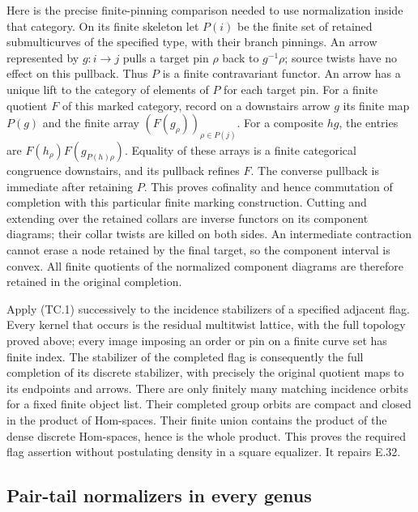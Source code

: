 Here is the precise finite-pinning comparison needed to use
normalization inside that category.  On its finite skeleton let $P(i)$
be the finite set of retained submulticurves of the specified type,
with their branch pinnings.  An arrow represented by $g:i\to j$
pulls a target pin $\rho$ back to $g^{-1}\rho$; source twists have no
effect on this pullback.  Thus $P$ is a finite contravariant functor.
An arrow has a unique lift to the category of elements of $P$ for each
target pin.  For a finite quotient $F$ of this marked category, record
on a downstairs arrow $g$ its finite map $P(g)$ and the finite array
$(F(g_\rho))_{\rho\in P(j)}$.  For a composite $hg$, the entries
are $F(h_\rho)F(g_{P(h)\rho})$.  Equality of these arrays is a finite
categorical congruence downstairs, and its pullback refines $F$.
The converse pullback is immediate after retaining $P$.
This proves cofinality and hence commutation of completion with this
particular finite marking construction.  Cutting and extending over
the retained collars are inverse functors on its component diagrams;
their collar twists are killed on both sides.  An intermediate
contraction cannot erase a node retained by the final target, so the
component interval is convex.  All finite quotients of the normalized
component diagrams are therefore retained in the original completion.

Apply (TC.1) successively to the incidence stabilizers of a specified
adjacent flag.  Every kernel that occurs is the residual multitwist
lattice, with the full topology proved above; every image imposing
an order or pin on a finite curve set has finite index.  The stabilizer
of the completed flag is consequently the full completion of its
discrete stabilizer, with precisely the original quotient maps to its
endpoints and arrows.  There are only finitely many matching incidence
orbits for a fixed finite object list.  Their completed group orbits
are compact and closed in the product of Hom-spaces.  Their finite union
contains the product of the dense discrete Hom-spaces, hence is the
whole product.  This proves the required flag assertion without
postulating density in a square equalizer.  It repairs E.32.

\subsection{Pair-tail normalizers in every genus}


